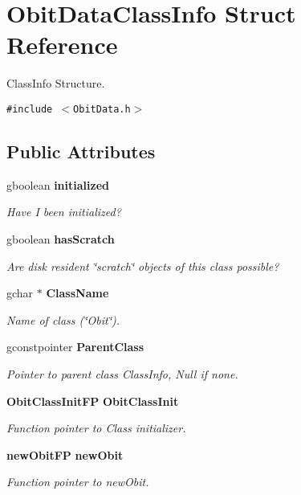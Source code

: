 \section{Obit\-Data\-Class\-Info Struct Reference}
\label{structObitDataClassInfo}
Class\-Info Structure.  


{\tt \#include $<$Obit\-Data.h$>$}

\subsection*{Public Attributes}
\begin{CompactItemize}
\item 
gboolean {\bf initialized}
\begin{CompactList}\small\item\em Have I been initialized? \item\end{CompactList}\item 
gboolean {\bf has\-Scratch}
\begin{CompactList}\small\item\em Are disk resident \char`\"{}scratch\char`\"{} objects of this class possible? \item\end{CompactList}\item 
gchar $\ast$ {\bf Class\-Name}
\begin{CompactList}\small\item\em Name of class (\char`\"{}Obit\char`\"{}). \item\end{CompactList}\item 
gconstpointer {\bf Parent\-Class}
\begin{CompactList}\small\item\em Pointer to parent class Class\-Info, Null if none. \item\end{CompactList}\item 
{\bf Obit\-Class\-Init\-FP} {\bf Obit\-Class\-Init}
\begin{CompactList}\small\item\em Function pointer to Class initializer. \item\end{CompactList}\item 
{\bf new\-Obit\-FP} {\bf new\-Obit}
\begin{CompactList}\small\item\em Function pointer to new\-Obit. \item\end{CompactList}\item 

\end{CompactItemize}

